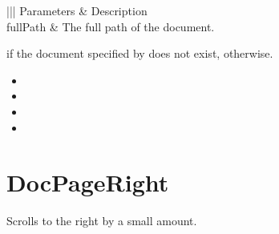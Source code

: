 \documentclass[letterpaper,12pt,english,openany,oneside]{sphinxmanual}
\begin{document}

\begin{sphinxVerbatim}[commandchars=\\\{\}]
\PYG{p}{[} \PYG{p}{]}
\end{sphinxVerbatim}
\label{\detokenize{IAC_API_DDE_Messages:parameters-8}}


\begin{savenotes}\sphinxattablestart
\centering
{}\label{\detokenize{IAC_API_DDE_Messages:section-8}}\nobreak
\begin{tabular}[t]{|||}
\hline
\sphinxstyletheadfamily 
Parameters
&\sphinxstyletheadfamily 
Description
\\
\hline
fullPath
&
The full path of the document.
\\
\hline
\end{tabular}
\par
\sphinxattableend\end{savenotes}


 if the document specified by  does not exist,  otherwise.

\label{\detokenize{IAC_API_DDE_Messages:related-methods-9}}
\begin{itemize}
\item {} 

\item {} 

\item {} 

\item {} 

\end{itemize}




\section{DocPageRight}
\label{\detokenize{IAC_API_DDE_Messages:id27}}
Scrolls to the right by a small amount.
\end{document}
